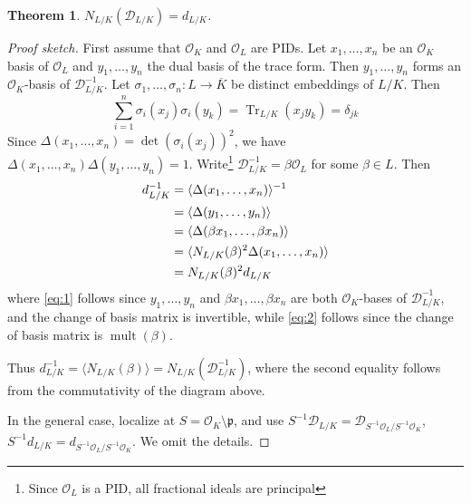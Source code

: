 \documentclass[11pt]{article}
\theoremstyle{definition}
\theoremstyle{plain}
\newtheorem{theorem}[definition]{Theorem}
\theoremstyle{remark}
\DeclareMathOperator{\Tr}{Tr}
\DeclareMathOperator{\mult}{mult}
\newcommand{\cD}{\mathcal{D}}
\newcommand{\cO}{\mathcal{O}}
\newcommand{\fp}{\mathfrak{p}}
\begin{document}
\begin{theorem}\label{thm:12_7}
    $N_{L/K}(\cD_{L/K}) = d_{L/K}$.
\end{theorem}
\begin{proof}[Proof sketch]
    First assume that $\cO_K$ and $\cO_L$ are PIDs. Let $x_1, \ldots, x_n$ be an $\cO_K$ basis of $\cO_L$ and $y_1, \ldots, y_n$ the dual basis of the trace form. Then $y_1, \ldots, y_n$ forms an $\cO_K$-basis of $\cD_{L/K}^{-1}$. Let $\sigma_1, \ldots, \sigma_n : L \to \overline{K}$ be distinct embeddings of $L/K$. Then
    \begin{equation*}
        \sum_{i=1}^n \sigma_i(x_j) \sigma_i(y_k) = \Tr_{L/K}(x_j y_k) = \delta_{j k}
    \end{equation*}
    Since $\Delta(x_1, \ldots, x_n) = \det(\sigma_i(x_j))^2$, we have $\Delta(x_1, \ldots, x_n) \Delta(y_1, \ldots, y_n) = 1$. Write\footnote{Since $\cO_L$ is a PID, all fractional ideals are principal} $\cD_{L/K}^{-1} = \beta \cO_L$ for some $\beta \in L$. Then
    \begin{align}
        d_{L/K}^{-1}
        &= \langle \Delta(x_1, \ldots, x_n) \rangle^{-1} \notag\\
        &= \langle \Delta(y_1, \ldots, y_n) \rangle \notag\\
        &= \langle \Delta(\beta x_1, \ldots, \beta x_n) \rangle \label{eq:1}\\
        &= \langle N_{L/K}(\beta)^2 \Delta(x_1, \ldots, x_n) \rangle \label{eq:2}\\
        &= N_{L/K}(\beta)^2 d_{L/K}\notag
    \end{align}
    where \eqref{eq:1} follows since $y_1, \ldots, y_n$ and $\beta x_1, \ldots, \beta x_n$ are both $\cO_K$-bases of $\cD_{L/K}^{-1}$, and the change of basis matrix is invertible, while \eqref{eq:2} follows since the change of basis matrix is $\mult(\beta)$.

    Thus $d_{L/K}^{-1} = \langle N_{L/K}(\beta) \rangle = N_{L/K}(\cD_{L/K}^{-1})$, where the second equality follows from the commutativity of the diagram above.

    In the general case, localize at $S = \cO_K \setminus \fp$, and use $S^{-1} \cD_{L/K} = \cD_{S^{-1} \cO_L / S^{-1} \cO_K}$, $S^{-1} d_{L/K} = d_{S^{-1} \cO_L / S^{-1} \cO_K}$. We omit the details.
\end{proof}
\end{document}
